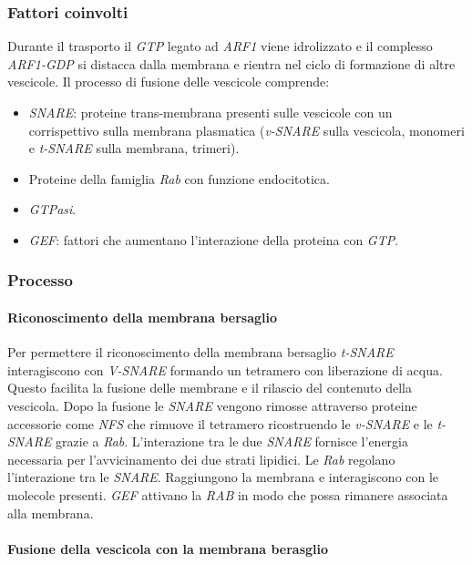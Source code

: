 		\subsubsection{Fattori coinvolti}
		Durante il trasporto il \emph{GTP} legato ad \emph{ARF1} viene idrolizzato e il complesso \emph{ARF1-GDP} si distacca dalla membrana e rientra nel ciclo di formazione di altre vescicole.
		Il processo di fusione delle vescicole comprende:
		\begin{multicols}{2}
			\begin{itemize}
				\item \emph{SNARE}: proteine trans-membrana presenti sulle vescicole con un corrispettivo sulla membrana plasmatica (\emph{v-SNARE} sulla vescicola, monomeri e \emph{t-SNARE} sulla membrana, trimeri).
				\item Proteine della famiglia \emph{Rab} con funzione endocitotica.
				\item \emph{GTPasi}.
				\item \emph{GEF}: fattori che aumentano l'interazione della proteina con \emph{GTP}.
			\end{itemize}
		\end{multicols}

		\subsubsection{Processo}

			\paragraph{Riconoscimento della membrana bersaglio}
			Per permettere il riconoscimento della membrana bersaglio \emph{t-SNARE} interagiscono con \emph{V-SNARE} formando un tetramero con liberazione di acqua.
			Questo facilita la fusione delle membrane e il rilascio del contenuto della vescicola.
			Dopo la fusione le \emph{SNARE} vengono rimosse attraverso proteine accessorie come \emph{NFS} che rimuove il tetramero ricostruendo le \emph{v-SNARE} e le \emph{t-SNARE} grazie a \emph{Rab}.
			L'interazione tra le due \emph{SNARE} fornisce l'energia necessaria per l'avvicinamento dei due strati lipidici.
			Le \emph{Rab} regolano l'interazione tra le \emph{SNARE}.
			Raggiungono la membrana e interagiscono con le molecole presenti.
			\emph{GEF} attivano la \emph{RAB} in modo che possa rimanere associata alla membrana.

			\paragraph{Fusione della vescicola con la membrana berasglio}

